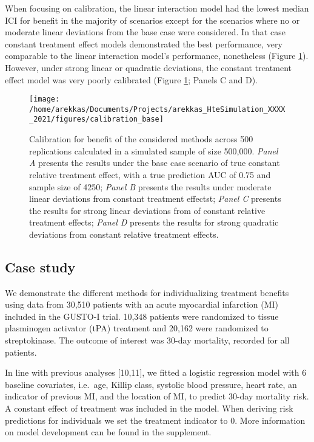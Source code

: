\documentclass{article}
\begin{document}
When focusing on calibration, the linear interaction model had the
lowest median ICI for benefit in the majority of scenarios except for
the scenarios where no or moderate linear deviations from the base case
were considered. In that case constant treatment effect models
demonstrated the best performance, very comparable to the linear
interaction model's performance, nonetheless (Figure
\ref{fig:calibration}). However, under strong linear or quadratic
deviations, the constant treatment effect model was very poorly
calibrated (Figure \ref{fig:calibration}; Panels C and D).

\begin{figure}
\texttt{[image: /home/arekkas/Documents/Projects/arekkas\_HteSimulation\_XXXX\_2021/figures/calibration\_base]} \caption{Calibration for benefit of the considered methods across 500 replications calculated in a simulated sample of size 500,000. \textit{Panel A} presents the results under the base case scenario of true constant relative treatment effect, with a true prediction AUC of 0.75 and sample size of 4250; \textit{Panel B} presents the results under moderate linear deviations from constant treatment effectst; \textit{Panel C} presents the results for strong linear deviations from of constant relative treatment effects; \textit{Panel D} presents the results for strong quadratic deviations from constant relative treatment effects.}\label{fig:calibration}
\end{figure}

\hypertarget{case-study}{%
\subsection{Case study}\label{case-study}}

We demonstrate the different methods for individualizing treatment
benefits using data from 30,510 patients with an acute myocardial
infarction (MI) included in the GUSTO-I trial. 10,348 patients were
randomized to tissue plasminogen activator (tPA) treatment and 20,162
were randomized to streptokinase. The outcome of interest was 30-day
mortality, recorded for all patients.

In line with previous analyses {[}10,11{]}, we fitted a logistic
regression model with 6 baseline covariates, i.e.~age, Killip class,
systolic blood pressure, heart rate, an indicator of previous MI, and
the location of MI, to predict 30-day mortality risk. A constant effect
of treatment was included in the model. When deriving risk predictions
for individuals we set the treatment indicator to 0. More information on
model development can be found in the supplement.
\end{document}
